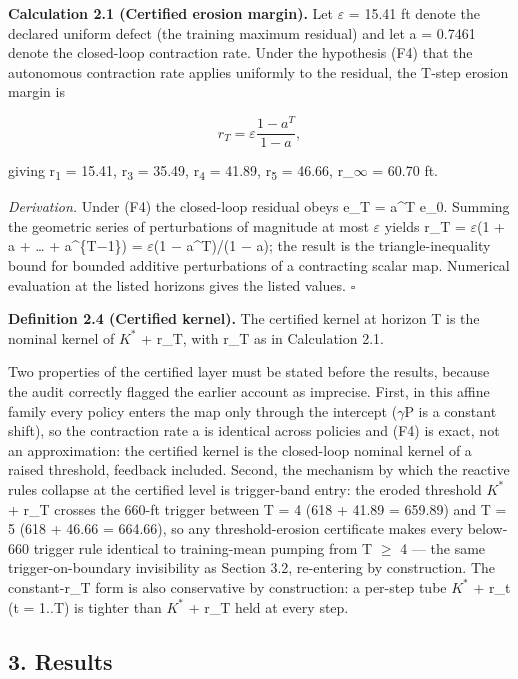 \documentclass[11pt]{article}
\begin{document}
\textbf{Calculation 2.1 (Certified erosion margin).} Let \ensuremath{\varepsilon} = 15.41 ft
denote the declared uniform defect (the training maximum residual) and
let a = 0.7461 denote the closed-loop contraction rate. Under the
hypothesis (F4) that the autonomous contraction rate applies uniformly
to the residual, the T-step erosion margin is

\[r_T = \varepsilon \frac{1 - a^T}{1 - a},\]

giving r\textsubscript{1} = 15.41, r\textsubscript{3} = 35.49, r\textsubscript{4} = 41.89, r\textsubscript{5} = 46.66, r\_\ensuremath{\infty} = 60.70 ft.

\emph{Derivation.} Under (F4) the closed-loop residual obeys e\_T =
a\^{}T e\_0. Summing the geometric series of perturbations of magnitude
at most \ensuremath{\varepsilon} yields r\_T = \ensuremath{\varepsilon}(1 + a + \ldots{} + a\^{}\{T\ensuremath{-}1\}) = \ensuremath{\varepsilon}(1 \ensuremath{-}
a\^{}T)/(1 \ensuremath{-} a); the result is the triangle-inequality bound for bounded
additive perturbations of a contracting scalar map. Numerical evaluation
at the listed horizons gives the listed values. \ensuremath{\square}

\textbf{Definition 2.4 (Certified kernel).} The certified kernel at
horizon T is the nominal kernel of \(K^{\ast}\) + r\_T, with r\_T as in
Calculation 2.1.

Two properties of the certified layer must be stated before the results,
because the audit correctly flagged the earlier account as imprecise.
First, in this affine family every policy enters the map only through
the intercept (\ensuremath{\gamma}P is a constant shift), so the contraction rate a is
identical across policies and (F4) is exact, not an approximation: the
certified kernel is the closed-loop nominal kernel of a raised
threshold, feedback included. Second, the mechanism by which the
reactive rules collapse at the certified level is trigger-band entry:
the eroded threshold \(K^{\ast}\) + r\_T crosses the 660-ft trigger
between T = 4 (618 + 41.89 = 659.89) and T = 5 (618 + 46.66 = 664.66),
so any threshold-erosion certificate makes every below-660 trigger rule
identical to training-mean pumping from T \ensuremath{\geq} 4 --- the same
trigger-on-boundary invisibility as Section 3.2, re-entering by
construction. The constant-r\_T form is also conservative by
construction: a per-step tube \(K^{\ast}\) + r\_t (t = 1..T) is tighter
than \(K^{\ast}\) + r\_T held at every step.

\subsection{3. Results}\label{results}
\end{document}
